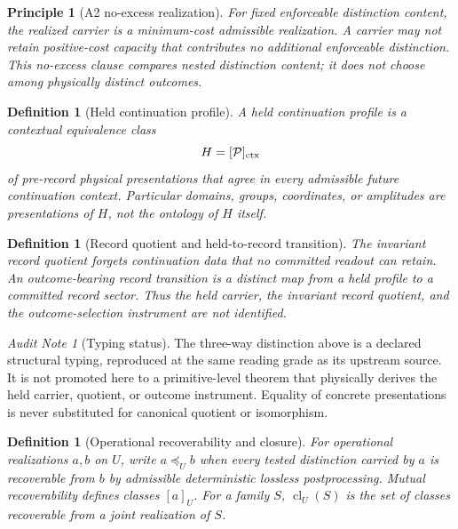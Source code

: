 \documentclass[11pt]{article}
\newtheorem{definition}[theorem]{Definition}
\newtheorem{principle}[theorem]{Principle}
\theoremstyle{remark}
\newtheorem{audit}[theorem]{Audit Note}
\begin{document}
\begin{principle}[A2 no-excess realization]\label{pr:ts-a2}
For fixed enforceable distinction content, the realized carrier is a minimum-cost admissible realization.  A carrier may not retain positive-cost capacity that contributes no additional enforceable distinction.  This no-excess clause compares nested distinction content; it does not choose among physically distinct outcomes.
\end{principle}

\begin{definition}[Held continuation profile]\label{def:ts-held-profile}
A held continuation profile is a contextual equivalence class
\[
H=[\mathcal P]_{\rm ctx}
\]
of pre-record physical presentations that agree in every admissible future continuation context.  Particular domains, groups, coordinates, or amplitudes are presentations of $H$, not the ontology of $H$ itself.
\end{definition}

\begin{definition}[Record quotient and held-to-record transition]\label{def:ts-record-transition}
The invariant record quotient forgets continuation data that no committed readout can retain.  An outcome-bearing record transition is a distinct map from a held profile to a committed record sector.  Thus the held carrier, the invariant record quotient, and the outcome-selection instrument are not identified.
\end{definition}

\begin{audit}[Typing status]
The three-way distinction above is a declared structural typing, reproduced at
the same reading grade as its upstream source.  It is not promoted here to a
primitive-level theorem that physically derives the held carrier, quotient, or
outcome instrument.  Equality of concrete presentations is never substituted
for canonical quotient or isomorphism.
\end{audit}

\begin{definition}[Operational recoverability and closure]\label{def:ts-operational-closure}
For operational realizations $a,b$ on $U$, write $a\preceq_U b$ when every tested distinction carried by $a$ is recoverable from $b$ by admissible deterministic lossless postprocessing.  Mutual recoverability defines classes $[a]_U$.  For a family $S$, $\operatorname{cl}_U(S)$ is the set of classes recoverable from a joint realization of $S$.
\end{definition}
\end{document}
